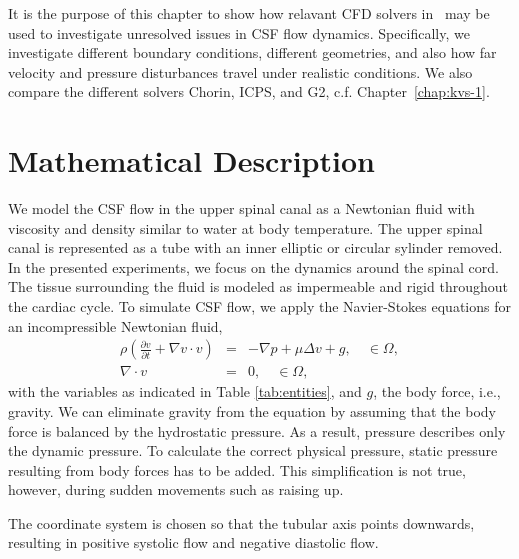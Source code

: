 It is the purpose of this
chapter to 
show how relavant CFD solvers in \fenics\ may be used to investigate unresolved issues in CSF flow dynamics. 
Specifically, we investigate
different boundary conditions, different geometries, and also how far velocity and pressure disturbances travel
under realistic conditions. We also compare the different solvers Chorin,
ICPS, and G2, c.f. Chapter~\ref{chap:kvs-1}.

\section{Mathematical Description}

We model the CSF flow in the upper spinal canal as a Newtonian fluid
 with viscosity and density similar to water
at body temperature. The upper spinal canal is represented as a tube 
with an inner elliptic or circular sylinder removed.  
In the presented experiments, we focus on the
dynamics around the spinal cord. The tissue surrounding the fluid is
modeled as impermeable and rigid throughout the cardiac cycle. To
simulate CSF flow, we apply the Navier-Stokes 
equations for an incompressible Newtonian fluid,
\begin{eqnarray*}
\rho \left(\frac{\partial v}{\partial t} + \nabla v \cdot v \right) &=& -\nabla p + \mu \Delta v + g, \quad \in \Omega, \\
\nabla \cdot v &=& 0, \quad \in \Omega,
\end{eqnarray*}
with the variables as indicated in Table \ref{tab:entities}, and $g$,
the body force, i.e., gravity. We can eliminate gravity from the
equation by assuming that the body force is balanced by the
hydrostatic pressure. As a result, pressure describes only the dynamic
pressure. To calculate the correct physical pressure, static
pressure resulting from body forces has to be added. This
simplification is not true, however, during sudden movements such as
raising up.

The coordinate system is chosen so that the tubular axis points downwards, resulting in positive systolic flow and negative diastolic flow.

